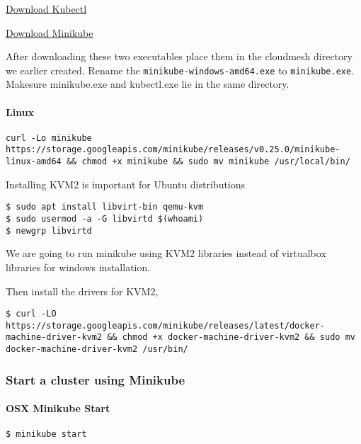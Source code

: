\href{http://storage.googleapis.com/kubernetes-release/release/v1.4.0/bin/windows/amd64/kubectl.exe}{Download
Kubectl}

\href{https://storage.googleapis.com/minikube/releases/v0.25.0/minikube-windows-amd64.exe}{Download
Minikube}

After downloading these two executables place them in the cloudmesh
directory we earlier created. Rename the \verb|minikube-windows-amd64.exe|
to \verb|minikube.exe|. Makesure minikube.exe and kubectl.exe lie in the
same directory.

\paragraph{Linux}\label{linux}

\begin{verbatim}
curl -Lo minikube https://storage.googleapis.com/minikube/releases/v0.25.0/minikube-linux-amd64 && chmod +x minikube && sudo mv minikube /usr/local/bin/
\end{verbatim}

Installing KVM2 is important for Ubuntu distributions

\begin{verbatim}
$ sudo apt install libvirt-bin qemu-kvm
$ sudo usermod -a -G libvirtd $(whoami)
$ newgrp libvirtd
\end{verbatim}

We are going to run minikube using KVM2 libraries instead of virtualbox
libraries for windows installation.

Then install the drivers for KVM2,

\begin{verbatim}
$ curl -LO https://storage.googleapis.com/minikube/releases/latest/docker-machine-driver-kvm2 && chmod +x docker-machine-driver-kvm2 && sudo mv docker-machine-driver-kvm2 /usr/bin/
\end{verbatim}

\subsubsection{Start a cluster using
Minikube}\label{start-a-cluster-using-minikube}

\paragraph{OSX Minikube Start}\label{osx-minikube-start}

\begin{verbatim}
$ minikube start
\end{verbatim}

